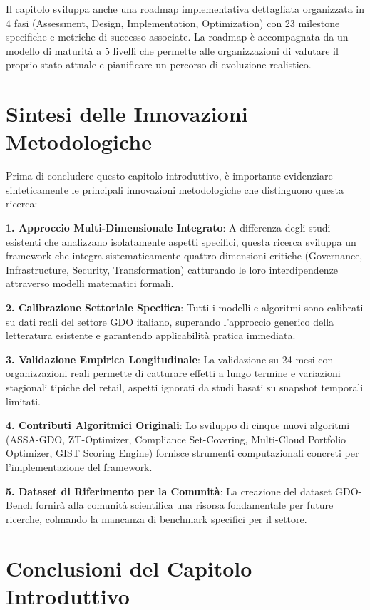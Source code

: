 Il capitolo sviluppa anche una roadmap implementativa dettagliata organizzata in 4 fasi (Assessment, Design, Implementation, Optimization) con 23 milestone specifiche e metriche di successo associate. La roadmap è accompagnata da un modello di maturità a 5 livelli che permette alle organizzazioni di valutare il proprio stato attuale e pianificare un percorso di evoluzione realistico.

\section{Sintesi delle Innovazioni Metodologiche}

Prima di concludere questo capitolo introduttivo, è importante evidenziare sinteticamente le principali innovazioni metodologiche che distinguono questa ricerca:

\textbf{1. Approccio Multi-Dimensionale Integrato}: A differenza degli studi esistenti che analizzano isolatamente aspetti specifici, questa ricerca sviluppa un framework che integra sistematicamente quattro dimensioni critiche (Governance, Infrastructure, Security, Transformation) catturando le loro interdipendenze attraverso modelli matematici formali.

\textbf{2. Calibrazione Settoriale Specifica}: Tutti i modelli e algoritmi sono calibrati su dati reali del settore GDO italiano, superando l'approccio generico della letteratura esistente e garantendo applicabilità pratica immediata.

\textbf{3. Validazione Empirica Longitudinale}: La validazione su 24 mesi con organizzazioni reali permette di catturare effetti a lungo termine e variazioni stagionali tipiche del retail, aspetti ignorati da studi basati su snapshot temporali limitati.

\textbf{4. Contributi Algoritmici Originali}: Lo sviluppo di cinque nuovi algoritmi (ASSA-GDO, ZT-Optimizer, Compliance Set-Covering, Multi-Cloud Portfolio Optimizer, GIST Scoring Engine) fornisce strumenti computazionali concreti per l'implementazione del framework.

\textbf{5. Dataset di Riferimento per la Comunità}: La creazione del dataset GDO-Bench fornirà alla comunità scientifica una risorsa fondamentale per future ricerche, colmando la mancanza di benchmark specifici per il settore.

\section{Conclusioni del Capitolo Introduttivo}

